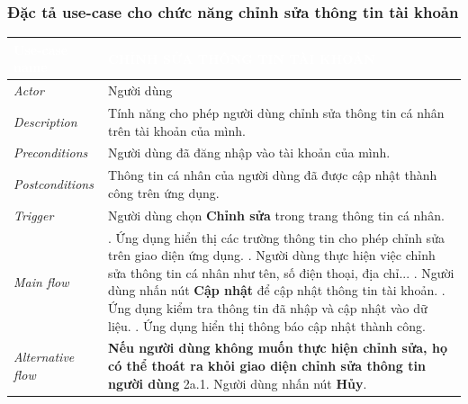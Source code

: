 \subsubsection{Đặc tả use-case cho chức năng chỉnh sửa thông tin tài khoản}
\begin{center}
    \arrayrulewidth=2pt
    \begin{longtable}{
        |>{\raggedright\arraybackslash}p{3cm}
        |>{\raggedright\arraybackslash}p{13cm}
        |}
        \hline
        \rowcolor{cyan!75!black} \textcolor{white}{\textbf{Use-case name}} & \textcolor{white}{\textbf{CHỈNH SỬA THÔNG TIN TÀI KHOẢN}}
        \\\hline
        \rowcolor{cyan!10!white} \textit{Actor} & Người dùng
        \\\hdashline
        \rowcolor{cyan!10!white} \textit{Description} & Tính năng cho phép người dùng chỉnh sửa thông tin cá nhân trên tài khoản của mình.
        \\\hdashline
        \rowcolor{cyan!10!white} \textit{Preconditions} & Người dùng đã đăng nhập vào tài khoản của mình.
        \\\hdashline
        \rowcolor{cyan!10!white} \textit{Postconditions} & Thông tin cá nhân của người dùng đã được cập nhật thành công trên ứng dụng.
        \\\hdashline
        \rowcolor{cyan!10!white} \textit{Trigger} & Người dùng chọn \textbf{Chỉnh sửa} trong trang thông tin cá nhân.
        \\\hdashline
        \rowcolor{cyan!10!white} \textit{Main flow} &
        1. Ứng dụng hiển thị các trường thông tin cho phép chỉnh sửa trên giao diện ứng dụng. \newline
        2. Người dùng thực hiện việc chỉnh sửa thông tin cá nhân như tên, số điện thoại, địa chỉ... \newline
        3. Người dùng nhấn nút \textbf{Cập nhật} để cập nhật thông tin tài khoản. \newline
        4. Ứng dụng kiểm tra thông tin đã nhập và cập nhật vào dữ liệu. \newline
        5. Ứng dụng hiển thị thông báo cập nhật thành công.
        \\\hdashline
        \rowcolor{cyan!10!white} \textit{Alternative flow} &
        \textbf{Nếu người dùng không muốn thực hiện chỉnh sửa, họ có thể thoát ra khỏi giao diện chỉnh sửa thông tin người dùng} \newline
        2a.1. Người dùng nhấn nút \textbf{Hủy}. \newline

\end{longtable}
\end{center}
